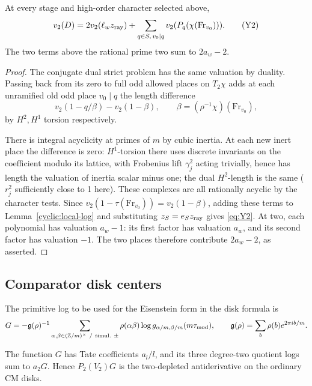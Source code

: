 \begin{proposition}\label{cyclic:determinant}
At every stage and high-order character selected above,
\[
           v_2(D)=2v_2(\ell_w z_{\rm ray})+
                  \sum_{q\in S,\,v_0\mid q}
                             v_2(P_q(\chi(\mathrm{Fr}_{v_0}))).
                  \tag{Y2}\label{eq:Y2}
\]
The two terms above the rational prime two sum to \(2a_w-2\).
\end{proposition}

\begin{proof}
The conjugate dual strict problem has the same valuation by duality. Passing
back from its zero to full odd allowed places on \(T_2\chi\) adds at each
unramified old odd place \(v_0\mid q\) the length difference
\[
                       v_2(1-q/\beta)-v_2(1-\beta),\qquad
                  \beta=(\rho^{-1}\chi)(\mathrm{Fr}_{v_0}),
\]
by \(H^2,H^1\) torsion respectively. 

There is integral acyclicity at primes of \(m\) by cubic inertia. At each new
inert place the difference is zero: \(H^1\)-torsion there uses discrete
invariants on the coefficient modulo its lattice, with Frobenius lift
\(\gamma_j^2\) acting trivially, hence has length the valuation of inertia
scalar minus one; the dual \(H^2\)-length is the same (\(r_j^2\) sufficiently
close to 1 here). These complexes are all rationally acyclic by the character
tests. Since \(v_2(1-\tau(\mathrm{Fr}_{v_0}))=v_2(1-\beta)\), adding
these terms to Lemma~\ref{cyclic:local-log} and substituting
\(z_S=e_Sz_{\rm ray}\) gives \eqref{eq:Y2}.  At two, each polynomial
has valuation \(a_w-1\): its first factor has valuation \(a_w\),
and its second factor has valuation \(-1\).  The two places
therefore contribute \(2a_w-2\), as asserted.
\end{proof}


\subsection{Comparator disk centers}

The primitive log to be used for the Eisenstein form in the disk formula is
\[
 G=-\mathfrak g(\rho)^{-1}
        \sum_{\alpha,\beta\in(\mathbb Z/m)^\times\ /\ {\rm simul.}\ \pm}
           \rho(\alpha\beta)\log g_{\alpha/m,\beta/m}(m\tau_{\rm mod}),
 \qquad \mathfrak g(\rho)=\sum_b\rho(b)e^{2\pi i b/m}.
\]
\begin{lemma}\label{cyclic:eisenstein-primitive}
The function \(G\) has Tate coefficients \(a_l/l\), and its
three degree-two quotient logs sum to \(a_2G\).  Hence
\(P_2(V_2)G\) is the two-depleted antiderivative on the ordinary
CM disks.
\end{lemma}

